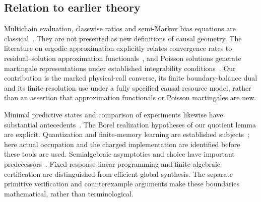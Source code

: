 \subsection*{Relation to earlier theory}
Multichain evaluation, classwise ratios and semi-Markov bias equations are classical~\cite{DenardoFox,FedergrunSchweitzer,LamondPuterman,Meyer}. They are not presented as new definitions of causal geometry. The literature on ergodic approximation explicitly relates convergence rates to residual--solution approximation functionals~\cite{Shaw}, and Poisson solutions generate martingale representations under established integrability conditions~\cite{GlynnInfanger}. Our contribution is the marked physical-call converse, its finite boundary-balance dual and its finite-resolution use under a fully specified causal resource model, rather than an assertion that approximation functionals or Poisson martingales are new.

Minimal predictive states and comparison of experiments likewise have substantial antecedents~\cite{ShaliziCrutchfield,Blackwell,Fritz}. The Borel realization hypotheses of our quotient lemma are explicit. Quantization and finite-memory learning are established subjects~\cite{GrafLuschgy,HellmanCover}; here actual occupation and the charged implementation are identified before these tools are used. Semialgebraic asymptotics and choice have important predecessors~\cite{BewleyKohlberg,BewleyKohlbergStationary,BasuPollackRoy}. Fixed-response linear programming and finite-algebraic certification are distinguished from efficient global synthesis. The separate primitive verification and counterexample arguments make these boundaries mathematical, rather than terminological.
